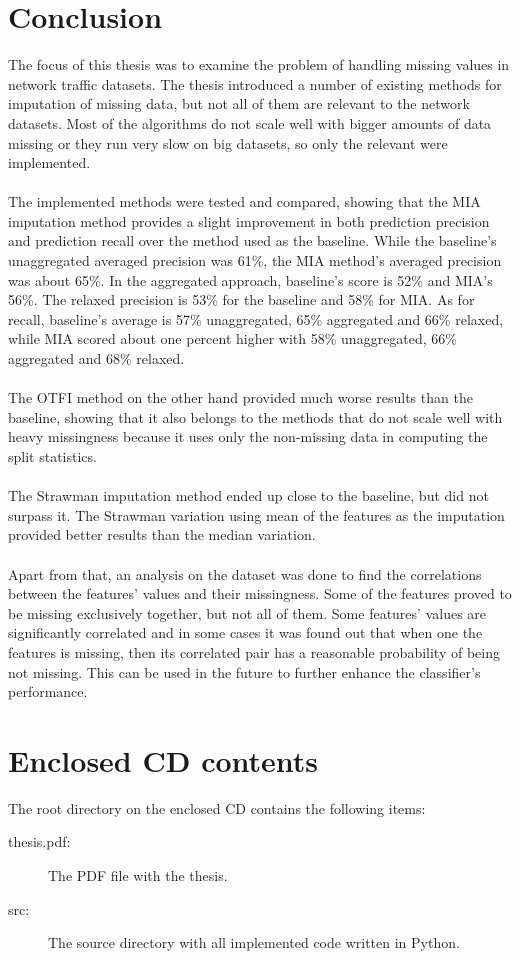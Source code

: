\documentclass[11pt]{article}
\begin{document}
  \section*{Conclusion}
    The focus of this thesis was to examine the problem of handling missing values in network traffic datasets. The thesis introduced a number of existing methods for imputation of missing data, but not all of them are relevant to the network datasets. Most of the algorithms do not scale well with bigger amounts of data missing or they run very slow on big datasets, so only the relevant were implemented.
    \\~\\
    The implemented methods were tested and compared, showing that the MIA imputation method provides a slight improvement in both prediction precision and prediction recall over the method used as the baseline. While the baseline's unaggregated averaged precision was 61\%, the MIA method's averaged precision was about 65\%. In the aggregated approach, baseline's score is 52\% and MIA's 56\%. The relaxed precision is 53\% for the baseline and 58\% for MIA. As for recall, baseline's average is 57\% unaggregated, 65\% aggregated and 66\% relaxed, while MIA scored about one percent higher with 58\% unaggregated, 66\% aggregated and 68\% relaxed.
    \\~\\
    The OTFI method on the other hand provided much worse results than the baseline, showing that it also belongs to the methods that do not scale well with heavy missingness because it uses only the non-missing data in computing the split statistics.
    \\~\\
    The Strawman imputation method ended up close to the baseline, but did not surpass it. The Strawman variation using mean of the features as the imputation provided better results than the median variation.
    \\~\\
    Apart from that, an analysis on the dataset was done to find the correlations between the features' values and their missingness. Some of the features proved to be missing exclusively together, but not all of them. Some features' values are significantly correlated and in some cases it was found out that when one the features is missing, then its correlated pair has a reasonable probability of being not missing. This can be used in the future to further enhance the classifier's performance.
  \newpage
  
  \newpage
  \appendix
    \section{Enclosed CD contents}
      The root directory on the enclosed CD contains the following items:
      \begin{description}
        \item[thesis.pdf:] The PDF file with the thesis.
        \item[src:] The source directory with all implemented code written in Python.
      \end{description}
\end{document}
